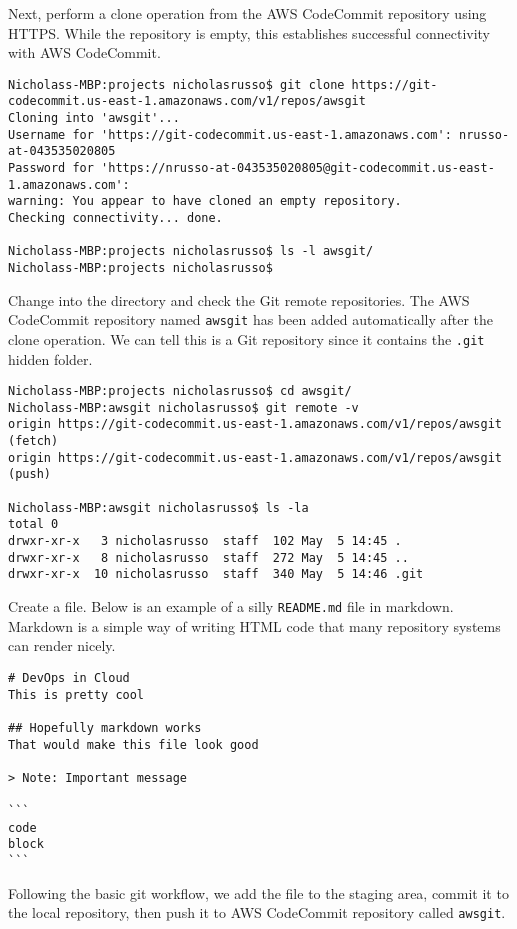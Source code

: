 Next, perform a clone operation from the AWS CodeCommit repository using
HTTPS. While the repository is empty, this establishes successful connectivity
with AWS CodeCommit.

\begin{verbatim}
Nicholass-MBP:projects nicholasrusso$ git clone https://git-codecommit.us-east-1.amazonaws.com/v1/repos/awsgit
Cloning into 'awsgit'...
Username for 'https://git-codecommit.us-east-1.amazonaws.com': nrusso-at-043535020805
Password for 'https://nrusso-at-043535020805@git-codecommit.us-east-1.amazonaws.com':
warning: You appear to have cloned an empty repository.
Checking connectivity... done.

Nicholass-MBP:projects nicholasrusso$ ls -l awsgit/
Nicholass-MBP:projects nicholasrusso$
\end{verbatim}

Change into the directory and check the Git remote repositories. The AWS
CodeCommit repository named \verb|awsgit| has been added automatically after
the clone operation. We can tell this is a Git repository since it contains
the \verb|.git| hidden folder.

\begin{verbatim}
Nicholass-MBP:projects nicholasrusso$ cd awsgit/
Nicholass-MBP:awsgit nicholasrusso$ git remote -v
origin https://git-codecommit.us-east-1.amazonaws.com/v1/repos/awsgit (fetch)
origin https://git-codecommit.us-east-1.amazonaws.com/v1/repos/awsgit (push)

Nicholass-MBP:awsgit nicholasrusso$ ls -la
total 0
drwxr-xr-x   3 nicholasrusso  staff  102 May  5 14:45 .
drwxr-xr-x   8 nicholasrusso  staff  272 May  5 14:45 ..
drwxr-xr-x  10 nicholasrusso  staff  340 May  5 14:46 .git
\end{verbatim}

Create a file. Below is an example of a silly \verb|README.md| file in markdown.
Markdown is a simple way of writing HTML code that many repository systems can
render nicely.

\begin{verbatim}
# DevOps in Cloud
This is pretty cool

## Hopefully markdown works
That would make this file look good

> Note: Important message

```
code
block
```
\end{verbatim}

Following the basic git workflow, we add the file to the staging area, commit
it to the local repository, then push it to AWS CodeCommit repository called
\verb|awsgit|.

